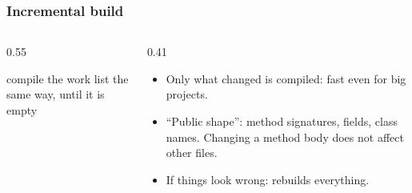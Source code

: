 \documentclass[aspectratio=169,10pt,compress]{beamer}
\begin{document}
\begin{frame}[t,fragile] \frametitle{Incremental build}
  \begin{columns}[T]
    \begin{column}{0.55\textwidth}
      \SetAlFnt{\small}


\begin{algorithm}[H]
  \caption{Build after a save}
  compile the work list the same way, until it is empty\;
\end{algorithm}

    \end{column}
    \begin{column}{0.41\textwidth}
      \begin{itemize}\small
        \item Only what changed is compiled: fast even for big projects.
        \item ``Public shape'': method signatures, fields, class names. Changing a method body does not affect other files.
        \item If things look wrong:  rebuilds everything.
      \end{itemize}
    \end{column}
  \end{columns}
\end{frame}

\end{document}
